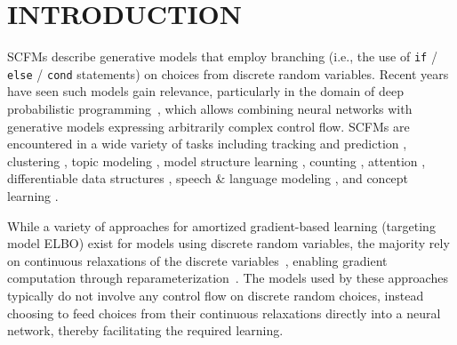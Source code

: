\vspace*{-1\baselineskip}
\section{INTRODUCTION}
\label{sec:introduction}

\Glspl{SCFM} describe generative models that employ branching (i.e., the use of {\small \texttt{if} / \texttt{else} / \texttt{cond}} statements) on choices from discrete random variables.
%
Recent years have seen such models gain relevance, particularly in the domain of deep probabilistic programming~\citep[Ch. 7]{siddharth2017learning,bingham2019pyro,tran2017deep,vandemeent2018intro}, which allows combining neural networks with generative models expressing arbitrarily complex control flow.
%
\Glspl{SCFM} are encountered in a wide variety of tasks including tracking and prediction \citep{neiswanger2014dependent,kosiorek2018sequential}, clustering \citep{rasmussen2000infinite}, topic modeling \citep{blei2003latent}, model structure learning \citep{adams2010learning}, counting \citep{eslami2016attend}, attention \citep{xu2015show}, differentiable data structures \citep{graves2014neural,graves2016hybrid,grefenstette2015learning}, speech \& language modeling \citep{juang1991hidden,chater2006probabilistic}, and concept learning \citep{kemp2006learning,lake2018emergence}.

While a variety of approaches for amortized gradient-based learning (targeting model \gls{ELBO}) exist for models using discrete random variables, the majority rely on continuous relaxations of the discrete variables~\citep[e.g.][]{rolfe2016dvae,vahdat2018dvaepp,vahdat2018dvaehash,oord2017neural,maddison2017concrete,jang2017categorical}, enabling gradient computation through reparameterization~\citep{kingma2014auto,rezende2014stochastic}.
%
The models used by these approaches typically do not involve any control flow on discrete random choices, instead choosing to feed choices from their continuous relaxations directly into a neural network, thereby facilitating the required learning.



